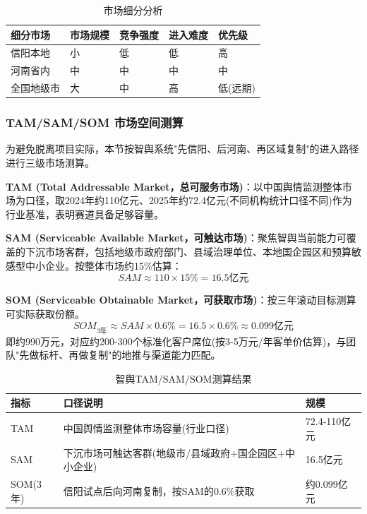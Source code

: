 \begin{table}[H]
	\centering
	\caption{市场细分分析}
	\begin{tabular}{L{2.5cm}C{2cm}C{2cm}C{2cm}C{2cm}}
		\toprule
		\textbf{细分市场} & \textbf{市场规模} & \textbf{竞争强度} & \textbf{进入难度} & \textbf{优先级} \\
		\midrule
		信阳本地          & 小             & 低             & 低             & 高            \\
		河南省内          & 中             & 中             & 中             & 中            \\
		全国地级市         & 大             & 中             & 高             & 低(远期)        \\
		\bottomrule
	\end{tabular}
\end{table}

\subsubsection{TAM/SAM/SOM 市场空间测算}

为避免脱离项目实际，本节按智舆系统"先信阳、后河南、再区域复制"的进入路径进行三级市场测算。

\textbf{TAM (Total Addressable Market，总可服务市场)}：以中国舆情监测整体市场为口径，取2024年约110亿元、2025年约72.4亿元(不同机构统计口径不同)作为行业基准，表明赛道具备足够容量。

\textbf{SAM (Serviceable Available Market，可触达市场)}：聚焦智舆当前能力可覆盖的下沉市场客群，包括地级市政府部门、县域治理单位、本地国企园区和预算敏感型中小企业。按整体市场约15\%估算：
\[
	SAM \approx 110 \times 15\% = 16.5\text{亿元}
\]

\textbf{SOM (Serviceable Obtainable Market，可获取市场)}：按三年滚动目标测算可实际获取份额。
\[
	SOM_{3\text{年}} \approx SAM \times 0.6\% = 16.5 \times 0.6\% \approx 0.099\text{亿元}
\]
即约990万元，对应约200-300个标准化客户席位(按3-5万元/年客单价估算)，与团队"先做标杆、再做复制"的地推与渠道能力匹配。

\begin{table}[H]
	\centering
	\caption{智舆TAM/SAM/SOM测算结果}
	\begin{tabular}{L{2.8cm}L{8.2cm}L{2.2cm}}
		\toprule
		\textbf{指标} & \textbf{口径说明}                 & \textbf{规模} \\
		\midrule
		TAM         & 中国舆情监测整体市场容量(行业口径)            & 72.4-110亿元  \\
		SAM         & 下沉市场可触达客群(地级市/县域政府+国企园区+中小企业) & 16.5亿元      \\
		SOM(3年)     & 信阳试点后向河南复制，按SAM的0.6\%获取       & 约0.099亿元    \\
		\bottomrule
	\end{tabular}
\end{table}

